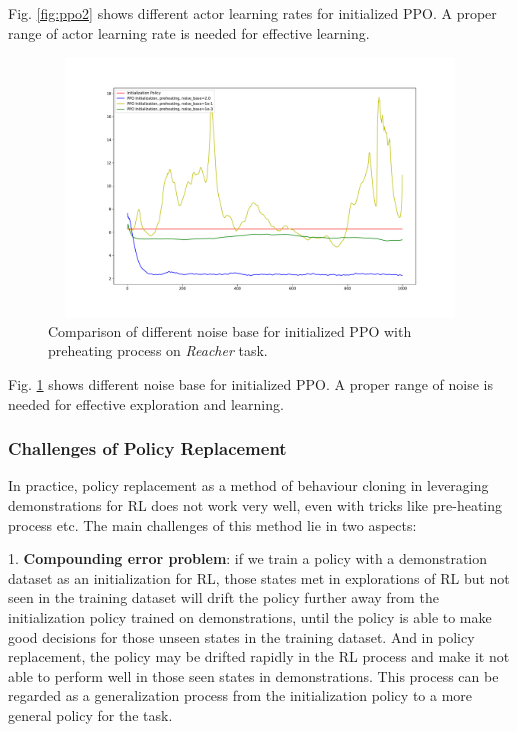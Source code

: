 \documentclass{article}
\begin{document}
Fig. \ref{fig:ppo2} shows different actor learning rates for initialized PPO. A proper range of actor learning rate is needed for effective learning.

\begin{figure}[htbp]
	\centering
	\includegraphics[height=260, width=450]{img/ppo_compare4.pdf}
	\caption{Comparison of different noise base for initialized PPO with preheating process on \textit{Reacher} task.}
	\label{fig:ppo3}
\end{figure}

Fig. \ref{fig:ppo3} shows different noise base for initialized PPO. A proper range of noise is needed for effective exploration and learning.

\subsubsection{Challenges of Policy Replacement}
In practice, policy replacement as a method of behaviour cloning in leveraging demonstrations for RL does not work very well, even with tricks like pre-heating process etc. The main challenges of this method lie in two aspects:

1. \textbf{Compounding error problem}: if we train a policy with a demonstration dataset as an initialization for RL, those states met in explorations of RL but not seen in the training dataset will drift the policy further away from the initialization policy trained on demonstrations, until the policy is able to make good decisions for those unseen states in the training dataset. And in policy replacement, the policy may be drifted rapidly in the RL process and make it not able to perform well in those seen states in demonstrations. This process can be regarded as a generalization process from the initialization policy to a more general policy for the task.
\end{document}
